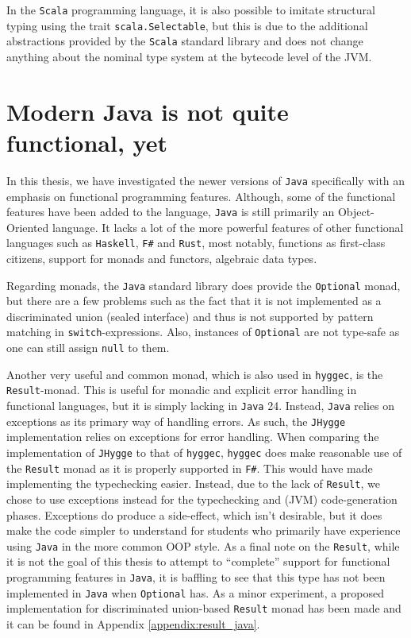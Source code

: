 In the \texttt{Scala} programming language, it is also possible to imitate structural typing using the trait \texttt{scala.Selectable}, but this is
due to the additional abstractions provided by the \texttt{Scala} standard library and does not change anything about the nominal
type system at the bytecode level of the JVM.

\section{Modern Java is not quite functional, yet}

In this thesis, we have investigated the newer versions of \texttt{Java} specifically with an emphasis on functional programming features.
Although, some of the functional features have been added to the language, \texttt{Java} is still primarily an Object-Oriented language.
It lacks a lot of the more powerful features of other functional languages such as \texttt{Haskell}, \texttt{F\#} and \texttt{Rust},
most notably, functions as first-class citizens, support for monads and functors, algebraic data types.

Regarding monads, the \texttt{Java} standard library does provide the \texttt{Optional} monad, but there are a few problems such as the
fact that it is not implemented as a discriminated union (sealed interface) and thus is not supported by pattern matching in
\texttt{switch}-expressions. Also, instances of \texttt{Optional} are not type-safe as one can still assign \texttt{null} to them.

Another very useful and common monad, which is also used in \texttt{hyggec}, is the \texttt{Result}-monad. This is useful for monadic
and explicit error handling in functional languages, but it is simply lacking in \texttt{Java} 24. Instead, \texttt{Java} relies on
exceptions as its primary way of handling errors. As such, the \texttt{JHygge} implementation relies on exceptions for error handling.
When comparing the implementation of \texttt{JHygge} to that of \texttt{hyggec}, \texttt{hyggec} does make reasonable use of the \texttt{Result}
monad as it is properly supported in \texttt{F\#}. This would have made implementing the typechecking easier. Instead, due to the lack
of \texttt{Result}, we chose to use exceptions instead for the typechecking and (JVM) code-generation phases. Exceptions do produce a
side-effect, which isn't desirable, but it does make the code simpler to understand for students who primarily have experience using
\texttt{Java} in the more common OOP style. As a final note on the \texttt{Result}, while it is not the goal of this thesis to attempt
to ``complete'' support for functional programming features in \texttt{Java}, it is baffling to see that this type has not been implemented
in \texttt{Java} when \texttt{Optional} has. As a minor experiment, a proposed implementation for discriminated union-based \texttt{Result}
monad has been made and it can be found in Appendix \ref{appendix:result_java}.

